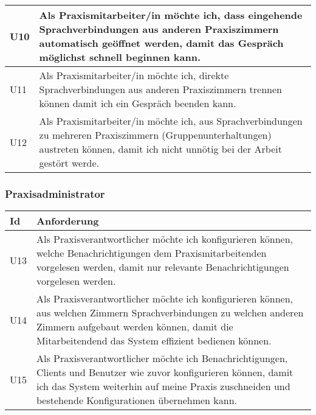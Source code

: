 \begin{table}[h]
\begin{tabular}{|l|p{15cm}|}
        \hline
        U10 & Als Praxismitarbeiter/in möchte ich, dass eingehende Sprachverbindungen aus anderen Praxiszimmern automatisch geöffnet werden, damit das Gespräch möglichst schnell beginnen kann.        \\
        \hline
        U11 & Als Praxismitarbeiter/in möchte ich, direkte Sprachverbindungen aus anderen Praxiszimmern trennen können damit ich ein Gespräch beenden kann.                                          \\
        \hline
        U12 & Als Praxismitarbeiter/in möchte ich, aus Sprachverbindungen zu mehreren Praxiszimmern (Gruppenunterhaltungen) austreten können, damit ich nicht unnötig bei der Arbeit gestört werde.  \\
        \hline
    \end{tabular}\label{tab:userstories0}
\end{table}

\clearpage

\subsubsection{Praxisadministrator}

\begin{table}[h]
    \centering
    \begin{tabular}{|l|p{15cm}|}
        \hline
        \textbf{Id} & \textbf{Anforderung}                                                                                                                                                                                                    \\
        \hline
        U13         & Als Praxisverantwortlicher möchte ich konfigurieren können, welche Benachrichtigungen dem Praxismitarbeitenden vorgelesen werden, damit nur relevante Benachrichtigungen vorgelesen werden.                                \\
        \hline
        U14         & Als Praxisverantwortlicher möchte ich konfigurieren können, aus welchen Zimmern Sprachverbindungen zu welchen anderen Zimmern aufgebaut werden können, damit die Mitarbeitendend das System effizient bedienen können.     \\
        \hline
        U15         & Als Praxisverantwortlicher möchte ich Benachrichtigungen, Clients und Benutzer wie zuvor konfigurieren können, damit ich das System weiterhin auf meine Praxis zuschneiden und bestehende Konfigurationen übernehmen kann. \\
        \hline
    \end{tabular}\label{tab:userstories2}
\end{table}


